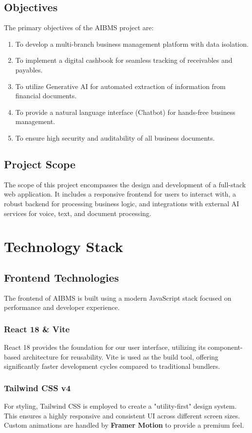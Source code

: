 \documentclass[12pt,a4paper]{report}
\begin{document}
\section{Objectives}
The primary objectives of the AIBMS project are:
\begin{enumerate}
    \item To develop a multi-branch business management platform with data isolation.
    \item To implement a digital cashbook for seamless tracking of receivables and payables.
    \item To utilize Generative AI for automated extraction of information from financial documents.
    \item To provide a natural language interface (Chatbot) for hands-free business management.
    \item To ensure high security and auditability of all business documents.
\end{enumerate}

\section{Project Scope}
The scope of this project encompasses the design and development of a full-stack web application. It includes a responsive frontend for users to interact with, a robust backend for processing business logic, and integrations with external AI services for voice, text, and document processing.

\chapter{Technology Stack}
\section{Frontend Technologies}
The frontend of AIBMS is built using a modern JavaScript stack focused on performance and developer experience.

\subsection{React 18 \& Vite}
React 18 provides the foundation for our user interface, utilizing its component-based architecture for reusability. Vite is used as the build tool, offering significantly faster development cycles compared to traditional bundlers.

\subsection{Tailwind CSS v4}
For styling, Tailwind CSS is employed to create a "utility-first" design system. This ensures a highly responsive and consistent UI across different screen sizes. Custom animations are handled by \textbf{Framer Motion} to provide a premium feel.
\end{document}
